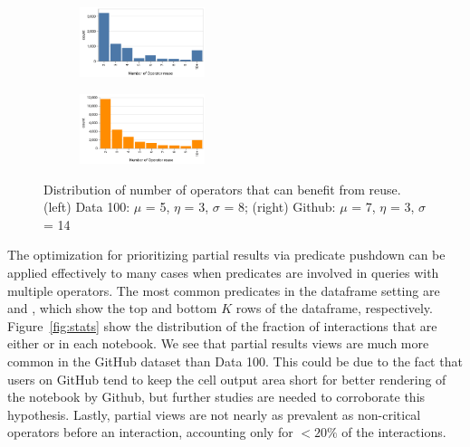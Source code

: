 \begin{figure}[h!]
     \centering
     \begin{subfigure}%
         \centering
         \includegraphics[width=0.4\textwidth]{submissions/interactivity/figures/ds_nre_v2.pdf}
     \end{subfigure}
     \hfill
     \begin{subfigure}%
         \centering
         \includegraphics[width=0.4\textwidth]{submissions/interactivity/figures/gb_nre_v2.pdf}
     \end{subfigure}
    \caption{Distribution of number of operators that can benefit from reuse. (left) Data 100: $\mu$ = 5, $\eta$ = 3, $\sigma$ = 8; (right) Github: $\mu$ = 7, $\eta$ = 3, $\sigma$ = 14}
    \label{fig:reuse}
\end{figure}


  The optimization for prioritizing partial results via predicate pushdown can be applied effectively to many cases when predicates are involved in queries with multiple operators.  The most common predicates in the dataframe setting are  and , which show the top and bottom $K$ rows of the dataframe, respectively. 
Figure~\ref{fig:stats} show the distribution of the fraction of interactions that are either  or  in each notebook. 
We see that partial results views are much more common in the GitHub dataset than Data 100. This could be due to the fact that users on GitHub tend to keep the cell output area short for better rendering of the notebook by Github, but further studies are needed to corroborate this hypothesis. Lastly, partial views are not nearly as prevalent as non-critical operators before an interaction, accounting only for $<20\%$ of the interactions. 


